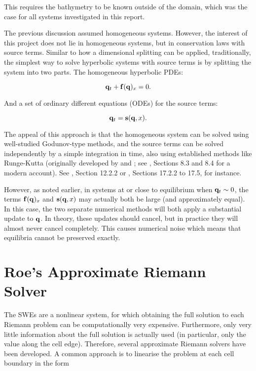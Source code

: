 This requires the bathymetry to be known outside of the domain, which was the case for all systems investigated in this report.

The previous discussion assumed homogeneous systems. However, the interest of this project does not lie in homogeneous systems, but in conservation laws with source terms. Similar to how a dimensional splitting can be applied, traditionally, the simplest way to solve hyperbolic systems with source terms is by splitting the system into two parts. The homogeneous hyperbolic PDEs:

$$
  \vb q_t + \vb f(\vb q)_x = 0.
$$

And a set of ordinary different equations (ODEs) for the source terms:

$$
  \vb q_t = \vb s(\vb q, x).
$$

The appeal of this approach is that the homogeneous system can be solved using well-studied Godunov-type methods, and the source terms can be solved independently by a simple integration in time, also using established methods like Runge-Kutta (originally developed by \citet{runge1895numerische} and \citet{kutta1901beitrag}; see \cite{kaw2009numerical}, Sections 8.3 and 8.4 for a modern account). See \cite{toro2001shock}, Section 12.2.2 or \cite{leveque2002finite}, Sections 17.2.2 to 17.5, for instance.

However, as noted earlier, in systems at or close to equilibrium when $\vb q_t \sim 0$, the terms $\vb f(\vb q)_x$ and $\vb s(\vb q, x)$ may actually both be large (and approximately equal). In this case, the two separate numerical methods will both apply a substantial update to $\vb q$. In theory, these updates should cancel, but in practice they will almost never cancel completely. This causes numerical noise which means that equilibria cannot be preserved exactly.

\section{Roe's Approximate Riemann Solver}
\label{sec:roe}

The SWEs are a nonlinear system, for which obtaining the full solution to each Riemann problem can be computationally very expensive. Furthermore, only very little information about the full solution is actually used (in particular, only the value along the cell edge). Therefore, several approximate Riemann solvers have been developed. A common approach is to linearise the problem at each cell boundary in the form

